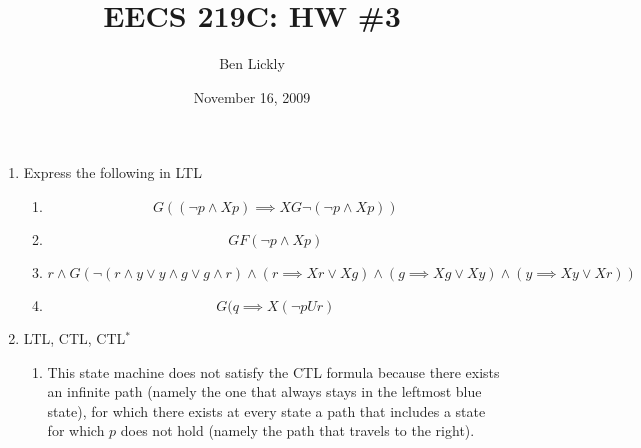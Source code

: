 \documentclass{article}
\title{EECS 219C: HW \#3}
\author{Ben Lickly}
\date{November 16, 2009}
\begin{document}
\maketitle
\begin{enumerate}
\item Express the following in LTL
  \begin{enumerate}
    \item \[G \left( (\neg p \wedge X p) \implies XG \neg (\neg p \wedge X p) \right) \]
    \item \[ GF (\neg p \wedge X p) \]
    \item \[ r \wedge G ( \neg ( r \wedge y \vee y \wedge g \vee g \wedge r)
      \wedge (r \implies X r \vee X g) \wedge (g \implies X g \vee X y)
      \wedge (y \implies X y \vee X r) ) \]
    \item \[G (q \implies X (\neg p U r)\]
  \end{enumerate}
\item LTL, CTL, CTL$^*$
  \begin{enumerate}
    \item This state machine does not satisfy the CTL formula because there exists an infinite path (namely the one that always stays in the leftmost blue state), for which there exists at every state a path that includes a state for which $p$ does not hold (namely the path that travels to the right).


\end{enumerate}
\end{enumerate}
\end{document}
